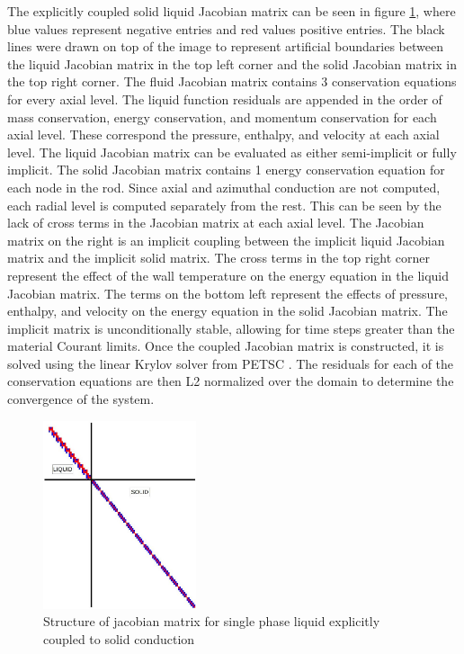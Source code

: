 	The explicitly coupled solid liquid Jacobian matrix can be seen in figure
	\ref{fig:Explicit-Diagram}, where blue values represent negative entries and
	red values positive entries. The black lines were drawn on top of the image to
	represent artificial boundaries between the liquid Jacobian matrix in the top
	left corner and the solid Jacobian matrix in the top right corner. The fluid
	Jacobian matrix contains 3 conservation equations for every axial level. The
	liquid function residuals are appended in the order of mass conservation,
	energy conservation, and momentum conservation for each axial level. These
	correspond the pressure, enthalpy, and velocity at each axial level. The liquid
	Jacobian matrix can be evaluated as either semi-implicit or fully implicit. The
	solid Jacobian matrix contains 1 energy conservation equation for each node in
	the rod. Since axial and azimuthal conduction are not computed, each radial
	level is computed separately from the rest. This can be seen by the lack of
	cross terms in the Jacobian matrix at each axial level. The Jacobian matrix on
	the right is an implicit coupling between the implicit liquid Jacobian matrix
	and the implicit solid matrix. The cross terms in the top right corner
	represent the effect of the wall temperature on the energy equation in the
	liquid Jacobian matrix. The terms on the bottom left represent the effects of
	pressure, enthalpy, and velocity on the energy equation in the solid Jacobian
	matrix. The implicit matrix is unconditionally stable, allowing for time steps
	greater than the material Courant limits. Once the coupled Jacobian matrix is
	constructed, it is solved using the linear Krylov solver from PETSC . The
	residuals for each of the conservation equations are then L2 normalized over
	the domain to determine the convergence of the system.
	
	\begin{figure}[!h]
    	\centering
    	\includegraphics[width=0.40\textwidth]{images/Explicit-Diagram.jpg}
    	\caption{Structure of jacobian matrix for single phase liquid
    	explicitly coupled to solid conduction}
    	\label{fig:Explicit-Diagram}
    \end{figure}
    
